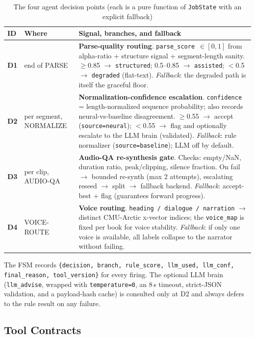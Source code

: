 \documentclass[12pt,a4paper]{article}
\begin{document}
\begin{table}[H]
\centering
\caption{The four agent decision points (each is a pure function of \texttt{JobState} with an explicit fallback)}
\small
\begin{tabularx}{\linewidth}{@{} l l L @{}}
\toprule
\textbf{ID} & \textbf{Where} & \textbf{Signal, branches, and fallback} \\
\midrule
\textbf{D1} & end of PARSE & \textbf{Parse-quality routing}. \texttt{parse\_score $\in[0,1]$} from alpha-ratio + structure signal + segment-length sanity. $\ge$0.85 $\rightarrow$ \texttt{structured}; 0.5--0.85 $\rightarrow$ \texttt{assisted}; $<$0.5 $\rightarrow$ \texttt{degraded} (flat-text). \emph{Fallback}: the degraded path is itself the graceful floor. \\
\addlinespace
\textbf{D2} & per segment, NORMALIZE & \textbf{Normalization-confidence escalation}. \texttt{confidence} = length-normalized sequence probability; also records neural-vs-baseline disagreement. $\ge$0.55 $\rightarrow$ accept (\texttt{source=neural}); $<$0.55 $\rightarrow$ flag and optionally escalate to the LLM brain (validated). \emph{Fallback}: rule normalizer (\texttt{source=baseline}); LLM off by default. \\
\addlinespace
\textbf{D3} & per clip, AUDIO-QA & \textbf{Audio-QA re-synthesis gate}. Checks: empty/NaN, duration ratio, peak/clipping, silence fraction. On fail $\rightarrow$ bounded re-synth (max 2 attempts), escalating reseed $\rightarrow$ split $\rightarrow$ fallback backend. \emph{Fallback}: accept-best + flag (guarantees forward progress). \\
\addlinespace
\textbf{D4} & VOICE-ROUTE & \textbf{Voice routing}. \texttt{heading / dialogue / narration} $\rightarrow$ distinct CMU-Arctic x-vector indices; the \texttt{voice\_map} is fixed per book for voice stability. \emph{Fallback}: if only one voice is available, all labels collapse to the narrator without failing. \\
\bottomrule
\end{tabularx}
\end{table}

The FSM records \texttt{\{decision, branch, rule\_score, llm\_used, llm\_conf, final\_reason, tool\_version\}} for every firing. The optional LLM brain (\texttt{llm\_advise}, wrapped with \texttt{temperature=0}, an 8\,s timeout, strict-JSON validation, and a payload-hash cache) is consulted only at D2 and always defers to the rule result on any failure.

\subsection{Tool Contracts}
\end{document}
